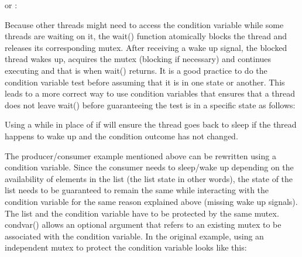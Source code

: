 
or :


Because other threads might need to access the condition variable while
some threads are waiting on it, the \textsf{wait()} function
atomically blocks the thread and releases its corresponding mutex.
After receiving a wake up signal, the blocked thread wakes up, acquires
the mutex (blocking if necessary) and continues executing and that is
when \textsf{wait()} returns. It is a good practice to do
the condition variable test before assuming that it is in one state or
another. This leads to a more correct way to use condition variables
that ensures that a thread does not leave \textsf{wait()}
before guaranteeing the test is in a specific state as follows:


Using a \textsf{while} in place of \textsf{if}
will ensure the thread goes back to sleep if the thread happens to wake
up and the condition outcome has not changed.

The producer/consumer example mentioned above can be rewritten using a
condition variable. Since the consumer needs to sleep/wake up depending
on the availability of elements in the list (the list state in other
words), the state of the list needs to be guaranteed to remain the same
while interacting with the condition variable for the same reason
explained above (missing wake up signals). The list and the condition
variable have to be protected by the same mutex.
\textsf{condvar()} allows an optional argument that refers
to an existing mutex to be associated with the condition variable. In
the original example, using an independent mutex to protect the
condition variable looks like this:

